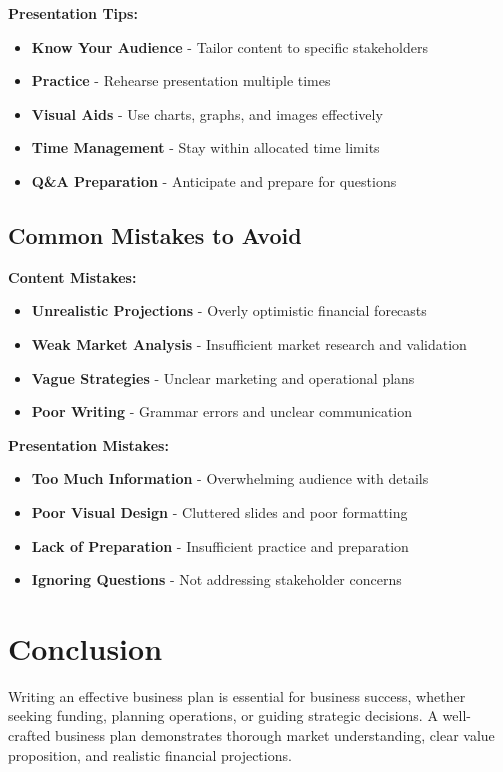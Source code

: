 \documentclass[12pt]{article}
\begin{document}
\textbf{Presentation Tips:}
\begin{itemize}
    \item \textbf{Know Your Audience} - Tailor content to specific stakeholders
    \item \textbf{Practice} - Rehearse presentation multiple times
    \item \textbf{Visual Aids} - Use charts, graphs, and images effectively
    \item \textbf{Time Management} - Stay within allocated time limits
    \item \textbf{Q\&A Preparation} - Anticipate and prepare for questions
\end{itemize}

\subsection{Common Mistakes to Avoid}

\textbf{Content Mistakes:}
\begin{itemize}
    \item \textbf{Unrealistic Projections} - Overly optimistic financial forecasts
    \item \textbf{Weak Market Analysis} - Insufficient market research and validation
    \item \textbf{Vague Strategies} - Unclear marketing and operational plans
    \item \textbf{Poor Writing} - Grammar errors and unclear communication
\end{itemize}

\textbf{Presentation Mistakes:}
\begin{itemize}
    \item \textbf{Too Much Information} - Overwhelming audience with details
    \item \textbf{Poor Visual Design} - Cluttered slides and poor formatting
    \item \textbf{Lack of Preparation} - Insufficient practice and preparation
    \item \textbf{Ignoring Questions} - Not addressing stakeholder concerns
\end{itemize}

\section{Conclusion}

Writing an effective business plan is essential for business success, whether seeking funding, planning operations, or guiding strategic decisions. A well-crafted business plan demonstrates thorough market understanding, clear value proposition, and realistic financial projections.
\end{document}
